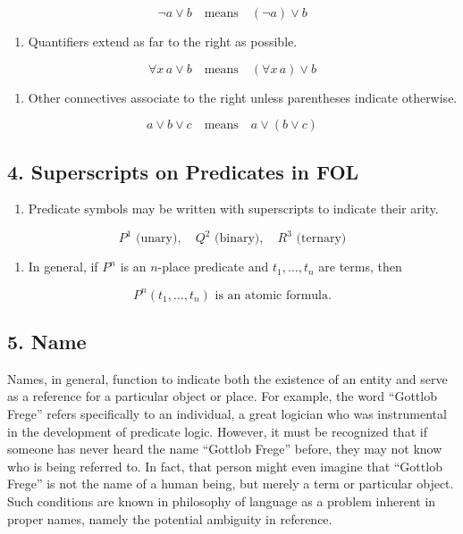\[
  \lnot a \lor b \quad \text{means} \quad (\lnot a) \lor b
  \]

\begin{enumerate}
\def\labelenumi{\arabic{enumi}.}
\setcounter{enumi}{2}
\tightlist
\item
  Quantifiers extend as far to the right as possible.
\end{enumerate}

\[
  \forall x \, a \lor b \quad \text{means} \quad (\forall x \, a) \lor b
  \]

\begin{enumerate}
\def\labelenumi{\arabic{enumi}.}
\setcounter{enumi}{3}
\tightlist
\item
  Other connectives associate to the right unless parentheses indicate
  otherwise.
\end{enumerate}

\[
  a \lor b \lor c \quad \text{means} \quad a \lor (b \lor c)
  \]

\subsection{4. Superscripts on Predicates in
FOL}\label{superscripts-on-predicates-in-fol}

\begin{enumerate}
\def\labelenumi{\arabic{enumi}.}
\tightlist
\item
  Predicate symbols may be written with superscripts to indicate their
  arity.
\end{enumerate}

\[
  P^1 \text{ (unary)}, \quad Q^2 \text{ (binary)}, \quad R^3 \text{ (ternary)}
  \]

\begin{enumerate}
\def\labelenumi{\arabic{enumi}.}
\setcounter{enumi}{1}
\tightlist
\item
  In general, if \(P^n\) is an \(n\)-place predicate and
  \(t_1, \dots, t_n\) are terms, then
\end{enumerate}

\[P^n(t_1, \dots, t_n) \text{ is an atomic formula.}\]

\subsection{5. Name}\label{name}

Names, in general, function to indicate both the existence of an entity
and serve as a reference for a particular object or place. For example,
the word ``Gottlob Frege'' refers specifically to an individual, a great
logician who was instrumental in the development of predicate logic.
However, it must be recognized that if someone has never heard the name
``Gottlob Frege'' before, they may not know who is being referred to. In
fact, that person might even imagine that ``Gottlob Frege'' is not the
name of a human being, but merely a term or particular object. Such
conditions are known in philosophy of language as a problem inherent in
proper names, namely the potential ambiguity in reference.

